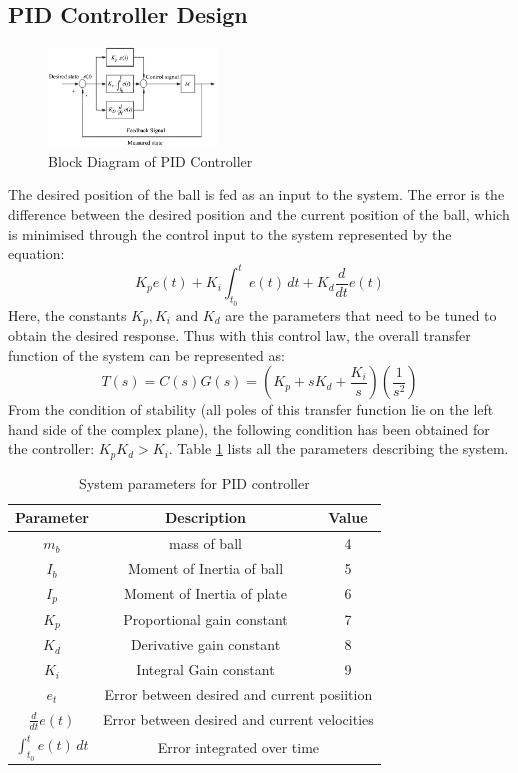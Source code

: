 \documentclass[conference]{IEEEtran}
\begin{document}
\subsection*{PID Controller Design}
\begin{figure}[htbp]
\centerline{\includegraphics[width=0.4\textwidth]{BDPID.png}}
\caption{Block Diagram of PID Controller}
\label{fig2}
\end{figure}
The desired position of the ball is fed as an input to the system. The error is the difference between the desired position and the current position of the ball, which is minimised through the control input to the system represented by the equation:
\begin{equation}
K_p e(t) + K_i \int_{t_0}^{t} e(t) \,dt + K_d \frac{d}{dt}e(t)
\label{eq17}\end{equation}
Here, the constants $K_p, K_i \mbox{ and } K_d $ are the parameters that need to be tuned to obtain the desired response. Thus with this control law, the overall transfer function of the system can be represented as: 
\begin{equation}
T(s) = C(s)G(s) = (K_p + sK_d + \frac{K_i}{s})(\frac{1}{s^2})
\label{eq18}\end{equation}
From the condition of stability (all poles of this transfer function lie on the left hand side of the complex plane), the following condition has been obtained for the controller: $ K_p K_d > K_i$.
Table \ref{table2} lists all the parameters describing the system.

\begin{table}[h!]
\caption{System parameters for PID controller}
\begin{center}
\begin{tabular}{| c | c | c |}
 \hline
 Parameter & Description & Value\\
\hline
$m_{b}$  & mass of ball  & 4\\
\hline
 $I_{b}$  & Moment of Inertia of ball  & 5\\
\hline
 $I_{p}$  & Moment of Inertia of plate  & 6\\
\hline
 $K_{p}$  & Proportional gain constant  & 7\\
\hline
 $K_{d}$  & Derivative gain constant & 8\\
\hline
 $K_{i}$ & Integral Gain constant & 9\\
\hline
 $e_{t}$  & \multicolumn{2}{c|}{Error between desired and current posiition} \\
\hline
$\frac{d}{dt}e(t)$ &\multicolumn{2}{c|}{Error between desired and current velocities}\\
\hline
$\int_{t_0}^{t} e(t) \,dt$ & \multicolumn{2}{c|}{Error integrated over time}\\
\hline
\end{tabular}\label{table2}
\end{center}
\end{table}
\end{document}
